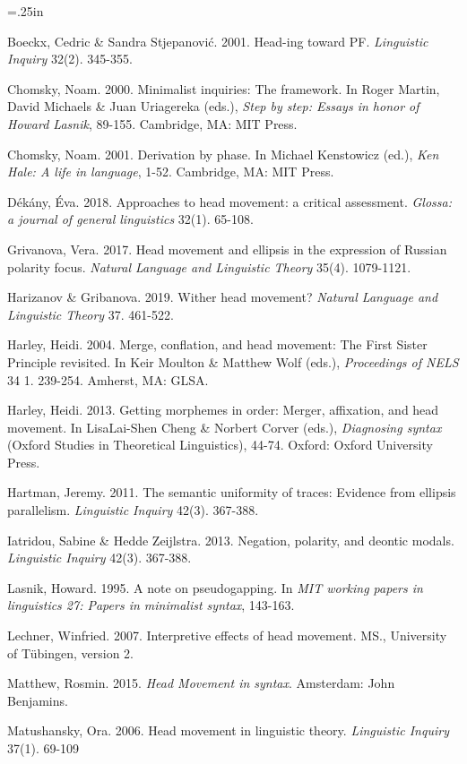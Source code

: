 \documentclass[]{ling-200b-2}
\makeatletter
\newcommand{\hangpara}[2]{\hangindent#1\hangafter#2\noindent}
\newenvironment{hangparas}[2]{\setlength{\parindent}{\z@}%
  \everypar={\hangpara{#1}{#2}}}{\par}
\makeatother
\begin{document}
\begin{hangparas}{.25in}{1}
\small

Boeckx, Cedric \& Sandra Stjepanović. 2001. Head-ing toward PF. \textit{Linguistic Inquiry} 32(2). 345-355.

Chomsky, Noam. 2000. Minimalist inquiries: The framework. In Roger Martin, David Michaels \& Juan Uriagereka (eds.), \textit{Step by step: Essays in honor of Howard Lasnik}, 89-155. Cambridge, MA: MIT Press.

Chomsky, Noam. 2001. Derivation by phase. In Michael Kenstowicz (ed.), \textit{Ken Hale: A life in language}, 1-52. Cambridge, MA: MIT Press.

Dékány, Éva. 2018. Approaches to head movement: a critical assessment. \textit{Glossa: a journal of general linguistics} 32(1). 65-108.

Grivanova, Vera. 2017. Head movement and ellipsis in the expression of Russian polarity focus. \textit{Natural Language and Linguistic Theory} 35(4). 1079-1121.

Harizanov \& Gribanova. 2019. Wither head movement? \textit{Natural Language and Linguistic Theory} 37. 461-522.

Harley, Heidi. 2004. Merge, conflation, and head movement: The First Sister Principle revisited. In Keir Moulton \& Matthew Wolf (eds.), \textit{Proceedings of NELS} 34 1. 239-254. Amherst, MA: GLSA.

Harley, Heidi. 2013. Getting morphemes in order: Merger, affixation, and head movement. In LisaLai-Shen Cheng \& Norbert Corver (eds.), \textit{Diagnosing syntax} (Oxford Studies in Theoretical Linguistics), 44-74. Oxford: Oxford University Press.

Hartman, Jeremy. 2011. The semantic uniformity of traces: Evidence from ellipsis parallelism. \textit{Linguistic Inquiry} 42(3). 367-388.

Iatridou, Sabine \& Hedde Zeijlstra. 2013. Negation, polarity, and deontic modals. \textit{Linguistic Inquiry} 42(3). 367-388.

Lasnik, Howard. 1995. A note on pseudogapping. In \textit{MIT working papers in linguistics 27: Papers in minimalist syntax}, 143-163.

Lechner, Winfried. 2007. Interpretive effects of head movement. MS., University of Tübingen, version 2.

Matthew, Rosmin. 2015. \textit{Head Movement in syntax}. Amsterdam: John Benjamins.

Matushansky, Ora. 2006. Head movement in linguistic theory. \textit{Linguistic Inquiry} 37(1). 69-109


\end{hangparas}
\end{document}
